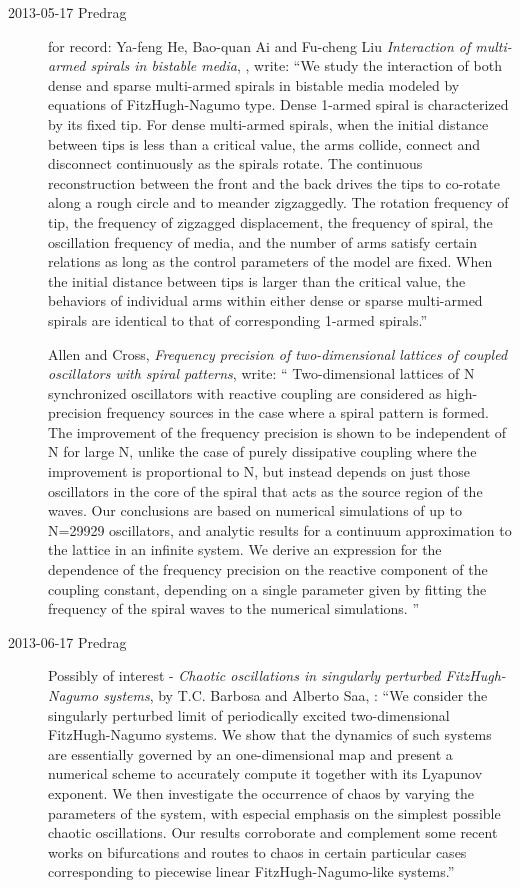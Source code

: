\begin{description}
\item[2013-05-17 Predrag] for record:
Ya-feng He, Bao-quan Ai and Fu-cheng Liu
{\em Interaction of multi-armed spirals in bistable media},
, write:
  ``We study the interaction of both dense and sparse multi-armed spirals in
bistable media modeled by equations of FitzHugh-Nagumo type. Dense 1-armed
spiral is characterized by its fixed tip. For dense multi-armed spirals, when
the initial distance between tips is less than a critical value, the arms
collide, connect and disconnect continuously as the spirals rotate. The
continuous reconstruction between the front and the back drives the tips to
co-rotate along a rough circle and to meander zigzaggedly. The rotation
frequency of tip, the frequency of zigzagged displacement, the frequency of
spiral, the oscillation frequency of media, and the number of arms satisfy
certain relations as long as the control parameters of the model are fixed.
When the initial distance between tips is larger than the critical value, the
behaviors of individual arms within either dense or sparse multi-armed spirals
are identical to that of corresponding 1-armed spirals.''

Allen and Cross,
{\em Frequency precision of two-dimensional lattices
          of coupled oscillators with spiral patterns},
write: ``
Two-dimensional lattices of N synchronized oscillators with reactive
coupling are considered as high-precision frequency sources in the case
where a spiral pattern is formed. The improvement of the frequency
precision is shown to be independent of N for large N, unlike the case of
purely dissipative coupling where the improvement is proportional to N,
but instead depends on just those oscillators in the core of the spiral
that acts as the source region of the waves. Our conclusions are based on
numerical simulations of up to N=29929 oscillators, and analytic results
for a continuum approximation to the lattice in an infinite system. We
derive an expression for the dependence of the frequency precision on the
reactive component of the coupling constant, depending on a single
parameter given by fitting the frequency of the spiral waves to the
numerical simulations.
''

\item[2013-06-17 Predrag] Possibly of interest -
{\em Chaotic oscillations in singularly perturbed FitzHugh-Nagumo systems},
by T.C. Barbosa and Alberto Saa, :
``We consider the singularly perturbed limit of periodically excited
two-dimensional FitzHugh-Nagumo systems. We show that the dynamics of such
systems are essentially governed by an one-dimensional map and present a
numerical scheme to accurately compute it together with its Lyapunov exponent.
We then investigate the occurrence of chaos by varying the parameters of the
system, with especial emphasis on the simplest possible chaotic oscillations.
Our results corroborate and complement some recent works on bifurcations and
routes to chaos in certain particular cases corresponding to piecewise linear
FitzHugh-Nagumo-like systems.''


\end{description}
